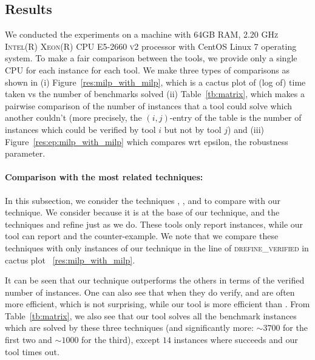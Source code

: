 \subsection{Results}
We conducted the experiments on a machine with \textsc{64GB RAM, 2.20 GHz Intel(R) Xeon(R) CPU E5-2660 v2}
processor with CentOS Linux 7 operating system. 
To make a fair comparison between the tools, we provide only a single \textsc{CPU} for each instance for each tool. 
We make three types of comparisons as shown in (i) Figure~\ref{res:milp_with_milp}, which is a cactus plot of (log of) time taken vs the number of benchmarks solved (ii) Table~\ref{tb:matrix}, which makes a pairwise comparison of the number of instances that a tool could solve which another couldn't  (more precisely, the $(i,j)$-entry of the table is the number of instances which could be verified by tool $i$ but not by tool $j$) and (iii) Figure~\ref{res:ep:milp_with_milp} which compares wrt epsilon, the robustness parameter.

\paragraph{Comparison with the most related techniques:}
In this subsection, we consider the techniques \deeppoly{}, \kpoly{}, and \deepsrgr{} to compare with our technique. 
We consider \deeppoly{} because it is at the base of our technique, and the techniques \kpoly{} and \deepsrgr{} refine \deeppoly{} just as we do. These tools only report \verified{} instances, while our tool can report  \verified{} and the counter-example. We note that we compare these techniques with only \verified{}  instances of our technique in the line of \textsc{drefine\_verified} in cactus plot ~\ref{res:milp_with_milp}. 

It can be seen that our technique outperforms the others in terms of the verified number of instances. One can also see that when they do verify, \deeppoly{} and \kpoly{} are often more efficient, which is not surprising, while our tool is more efficient than \deepsrgr{}. From Table~\ref{tb:matrix}, we also see  that our tool solves all the benchmark instances which are solved by these three techniques (and significantly more: $\sim 3700$ for the first two and $\sim 1000$ for the third), except $14$ instances where \kpoly{} succeeds and our tool times out.

